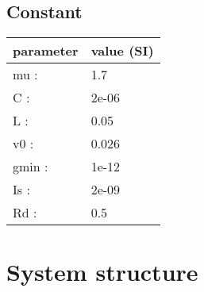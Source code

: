 \documentclass[11pt, oneside]{article}      %
\begin{document}
\subsection{Constant}
%
\begin{center}
%
\begin{tabular}{ll}
%
\hline
parameter & value (SI)
\\ \hline
mu :& 1.7
\\
C :& 2e-06
\\
L :& 0.05
\\
v0 :& 0.026
\\
gmin :& 1e-12
\\
Is :& 2e-09
\\
Rd :& 0.5
\\
\hline
\end{tabular}
%
\end{center}
%
\section{System structure}
%
\end{document}
